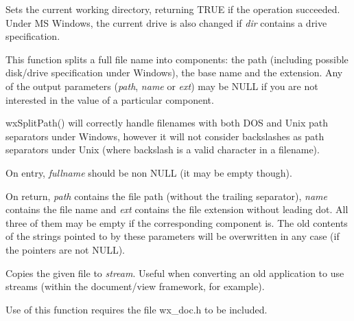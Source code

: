 

Sets the current working directory, returning TRUE if the operation succeeded.
Under MS Windows, the current drive is also changed if {\it dir} contains a drive specification.

\label{wxsplitfunction}


This function splits a full file name into components: the path (including possible disk/drive
specification under Windows), the base name and the extension. Any of the output parameters
({\it path}, {\it name} or {\it ext}) may be NULL if you are not interested in the value of
a particular component.

wxSplitPath() will correctly handle filenames with both DOS and Unix path separators under
Windows, however it will not consider backslashes as path separators under Unix (where backslash
is a valid character in a filename).

On entry, {\it fullname} should be non NULL (it may be empty though).

On return, {\it path} contains the file path (without the trailing separator), {\it name}
contains the file name and {\it ext} contains the file extension without leading dot. All
three of them may be empty if the corresponding component is. The old contents of the
strings pointed to by these parameters will be overwritten in any case (if the pointers
are not NULL).

\label{wxtransferfiletostream}


Copies the given file to {\it stream}. Useful when converting an old application to
use streams (within the document/view framework, for example).

Use of this function requires the file wx\_doc.h to be included.

\label{wxtransferstreamtofile}


